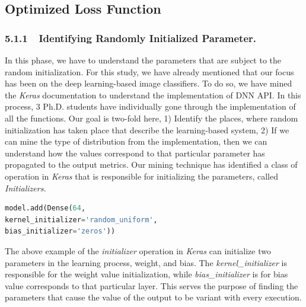 \subsection{Optimized Loss Function}
\subsubsection{5.1.1~~Identifying Randomly Initialized Parameter.}
In this phase, we have to understand the parameters that are subject to the random initialization. For this study, we have already mentioned that our focus has been on the deep learning-based image classifiers. To do so, we have mined the \emph{Keras} documentation to understand the implementation of DNN API. In this process, 3 Ph.D. students have individually gone through the implementation of all the functions. Our goal is two-fold here, 1) Identify the places, where random initialization has taken place that describe the learning-based system, 2) If we can mine the type of distribution from the implementation, then we can understand how the values correspond to that particular parameter has propagated to the output metrics. Our mining technique has identified a class of operation in \emph{Keras} that is responsible for initializing the parameters, called \emph{Initializers.} 
\begin{lstlisting}[language=Python, caption=Example of initialization parameters in Keras]
model.add(Dense(64,
kernel_initializer='random_uniform',
bias_initializer='zeros'))
\end{lstlisting}
The above example of the \emph{initializer} operation in \emph{Keras} can initialize two parameters in the learning process, weight, and bias. The \emph{kernel\_initializer} is responsible for the weight value initialization, while \emph{bias\_initializer} is for bias value corresponds to that particular layer. This serves the purpose of finding the parameters that cause the value of the output to be variant with every execution. 

